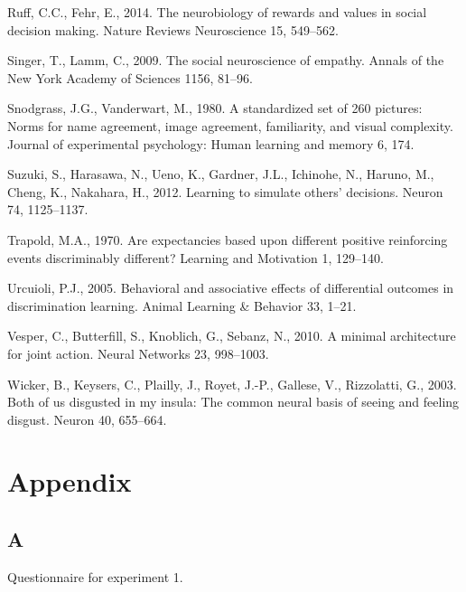 \documentclass[]{elsarticle} %
\begin{document}
\leavevmode\hypertarget{ref-ruff2014neurobiology}{}%
Ruff, C.C., Fehr, E., 2014. The neurobiology of rewards and values in
social decision making. Nature Reviews Neuroscience 15, 549--562.

\leavevmode\hypertarget{ref-singer2009social}{}%
Singer, T., Lamm, C., 2009. The social neuroscience of empathy. Annals
of the New York Academy of Sciences 1156, 81--96.

\leavevmode\hypertarget{ref-snodgrass1980standardized}{}%
Snodgrass, J.G., Vanderwart, M., 1980. A standardized set of 260
pictures: Norms for name agreement, image agreement, familiarity, and
visual complexity. Journal of experimental psychology: Human learning
and memory 6, 174.

\leavevmode\hypertarget{ref-suzuki2012learning}{}%
Suzuki, S., Harasawa, N., Ueno, K., Gardner, J.L., Ichinohe, N., Haruno,
M., Cheng, K., Nakahara, H., 2012. Learning to simulate others'
decisions. Neuron 74, 1125--1137.

\leavevmode\hypertarget{ref-trapold1970expectancies}{}%
Trapold, M.A., 1970. Are expectancies based upon different positive
reinforcing events discriminably different? Learning and Motivation 1,
129--140.

\leavevmode\hypertarget{ref-urcuioli2005behavioral}{}%
Urcuioli, P.J., 2005. Behavioral and associative effects of differential
outcomes in discrimination learning. Animal Learning \& Behavior 33,
1--21.

\leavevmode\hypertarget{ref-vesper2010minimal}{}%
Vesper, C., Butterfill, S., Knoblich, G., Sebanz, N., 2010. A minimal
architecture for joint action. Neural Networks 23, 998--1003.

\leavevmode\hypertarget{ref-wicker2003both}{}%
Wicker, B., Keysers, C., Plailly, J., Royet, J.-P., Gallese, V.,
Rizzolatti, G., 2003. Both of us disgusted in my insula: The common
neural basis of seeing and feeling disgust. Neuron 40, 655--664.

\endgroup

\hypertarget{appendix}{%
\section{Appendix}\label{appendix}}

\hypertarget{a}{%
\subsection{A}\label{a}}

Questionnaire for experiment 1.
\end{document}
